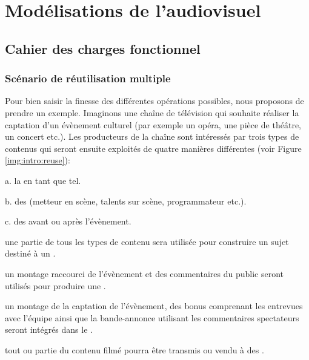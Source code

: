 \chapter{Modélisations de l'audiovisuel}\label{chap:mav}

\section{Cahier des charges fonctionnel}


\subsection{Scénario de réutilisation multiple}\label{sec:ex-reuse}
Pour bien saisir la finesse des différentes opérations possibles, nous proposons de prendre un exemple.
Imaginons une chaîne de télévision qui souhaite réaliser la captation d'un évènement culturel (par exemple un opéra, une pièce de théâtre, un concert etc.). 
Les producteurs de la chaîne sont intéressés par trois types de contenus qui seront ensuite exploités de quatre manières différentes (voir Figure \ref{img:intro:reuse}):
\begin{listenum}
	\item[a.] la  en tant que tel.
	\item[b.] des  (metteur en scène, talents sur scène, programmateur etc.). 
	\item[c.] des  avant ou après l'évènement.\\

	\item une partie de tous les types de contenu sera utilisée pour construire un sujet destiné à un . 
	\item un montage raccourci de l'évènement et des commentaires du public seront utilisés pour produire une .
	\item un montage de la captation de l'évènement, des bonus comprenant les entrevues avec l'équipe ainsi que la bande-annonce utilisant les commentaires spectateurs seront intégrés dans le .	 
	\item tout ou partie du contenu filmé pourra être transmis ou vendu à des . 
\end{listenum}

